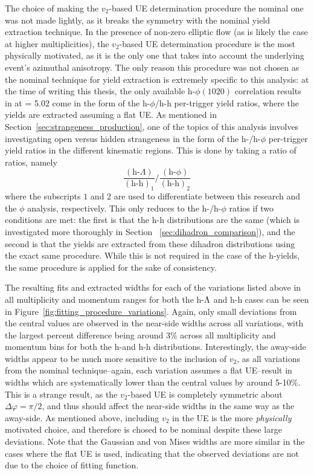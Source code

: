 The choice of making the $v_{2}$-based UE determination procedure the nominal one was not made lightly, as it breaks the symmetry with the nominal yield extraction technique. In the presence of non-zero elliptic flow (as is likely the case at higher multiplicities), the $v_{2}$-based UE determination procedure is the most physically motivated, as it is the only one that takes into account the underlying event's azimuthal anisotropy. The only reason this procedure was not chosen as the nominal technique for yield extraction is extremely specific to this analysis: at the time of writing this thesis, the only available h-$\phi(1020)$ correlation results in \pPb at \snn = 5.02 \TeV come in the form of the h-$\phi$/h-h per-trigger yield ratios, where the yields are extracted assuming a flat UE. As mentioned in Section~\ref{sec:strangeness_production}, one of the topics of this analysis involves investigating open versus hidden strangeness in the form of the h-\lmb/h-$\phi$ per-trigger yield ratios in the different kinematic regions. This is done by taking a ratio of ratios, namely
%
\begin{equation}
    \label{eq:ratio_of_ratios}
    \frac{(\text{h-}\Lambda)}{(\text{h-h})_{1}}/\frac{(\text{h-}\phi)}{(\text{h-h})_{2}}
\end{equation}
%
where the subscripts $1$ and $2$ are used to differentiate between this research and the $\phi$ analysis, respectively. This only reduces to the h-\lmb/h-$\phi$ ratios if two conditions are met: the first is that the h-h distributions are the same (which is investigated more thoroughly in Section ~\ref{sec:dihadron_comparison}), and the second is that the yields are extracted from these dihadron distributions using the exact same procedure. While this is not required in the case of the h-\lmb yields, the same procedure is applied for the sake of consistency. 


The resulting fits and extracted widths for each of the variations listed above in all multiplicity and momentum ranges for both the h-$\Lambda$ and h-h cases can be seen in Figure~\ref{fig:fitting_procedure_variations}. Again, only small deviations from the central values are observed in the near-side widths across all variations, with the largest percent difference being around 3\% across all multiplicity and momentum bins for both the h-\lmb and h-h distributions. Interestingly, the away-side widths appear to be much more sensitive to the inclusion of $v_{2}$, as all variations from the nominal technique--again, each variation assumes a flat UE--result in widths which are systematically lower than the central values by around 5-10\%. This is a strange result, as the $v_{2}$-based UE is completely symmetric about $\Delta\varphi = \pi/2$, and thus should affect the near-side widths in the same way as the away-side. As mentioned above, including $v_{2}$ in the UE is the more \textit{physically} motivated choice, and therefore is chosed to be nominal despite these large deviations. Note that the Gaussian and von Mises widths are more similar in the cases where the flat UE is used, indicating that the observed deviations are not due to the choice of fitting function.

